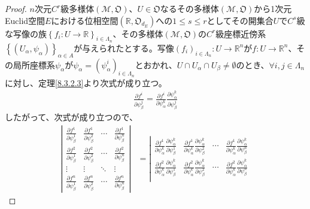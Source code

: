 \documentclass[dvipdfmx]{jsarticle}
\begin{document}
\begin{proof}
$n$次元$C^{r}$級多様体$\left( \mathcal{M},\mathfrak{O} \right)$、$U \in \mathfrak{O}$なるその多様体$\left( \mathcal{M},\mathfrak{O} \right)$から1次元Euclid空間$E$における位相空間$\left( \mathbb{R},\mathfrak{O}_{d_{E}} \right)$への$1\leq s \leq r$としてその開集合$U$で$C^{s}$級な写像の族$\left\{ f_i :U \rightarrow \mathbb{R} \right\}_{i\in \varLambda_n } $、その多様体$\left( \mathcal{M},\mathfrak{O} \right)$の$C^{r}$級座標近傍系$\left\{ \left( U_{\alpha},\psi_{\alpha} \right) \right\}_{\alpha \in A}$が与えられたとする。写像$\left( f_i \right)_{i\in \varLambda_n } :U \rightarrow \mathbb{R}^n $が$f:U \rightarrow \mathbb{R}^n $、その局所座標系$\psi_\alpha $が$\psi_\alpha =\left( \psi_\alpha^i \right)_{i\in \varLambda_n }$とおかれ、$U\cap U_\alpha \cap U_\beta \ne \emptyset $のとき、$\forall i,j\in \varLambda_n $に対し、定理\ref{8.3.2.3}より次式が成り立つ。
\begin{align*}
\frac{\partial f^i }{\partial \psi_\beta^j } = \frac{\partial f^i }{\partial \psi_\alpha^k } \frac{\partial \psi_\alpha^k }{\partial \psi_\beta^j } 
\end{align*}
したがって、次式が成り立つので、
\begin{align*}
\left| \begin{matrix}
  \frac{\partial f^1 }{\partial \psi_\beta^1 } & \frac{\partial f^1 }{\partial \psi_\beta^2 } & \cdots & \frac{\partial f^1 }{\partial \psi_\beta^n } \\
  \frac{\partial f^2 }{\partial \psi_\beta^1 } & \frac{\partial f^2 }{\partial \psi_\beta^2 } & \cdots & \frac{\partial f^2 }{\partial \psi_\beta^n } \\
  \vdots & \vdots & \ddots & \vdots \\
  \frac{\partial f^n }{\partial \psi_\beta^1 } & \frac{\partial f^n }{\partial \psi_\beta^2 } & \cdots & \frac{\partial f^n }{\partial \psi_\beta^n }
\end{matrix} \right| &= \left| \begin{matrix}
  \frac{\partial f^1 }{\partial \psi_\alpha^k } \frac{\partial \psi_\alpha^k }{\partial \psi_\beta^1 } & \frac{\partial f^1 }{\partial \psi_\alpha^k } \frac{\partial \psi_\alpha^k }{\partial \psi_\beta^2 }  & \cdots & \frac{\partial f^1 }{\partial \psi_\alpha^k } \frac{\partial \psi_\alpha^k }{\partial \psi_\beta^n }  \\
  \frac{\partial f^2 }{\partial \psi_\alpha^k } \frac{\partial \psi_\alpha^k }{\partial \psi_\beta^1 }  & \frac{\partial f^2 }{\partial \psi_\alpha^k } \frac{\partial \psi_\alpha^k }{\partial \psi_\beta^2 }  & \cdots & \frac{\partial f^2 }{\partial \psi_\alpha^k } \frac{\partial \psi_\alpha^k }{\partial \psi_\beta^n }  \\

\end{matrix}
\end{align*}
\end{proof}
\end{document}
